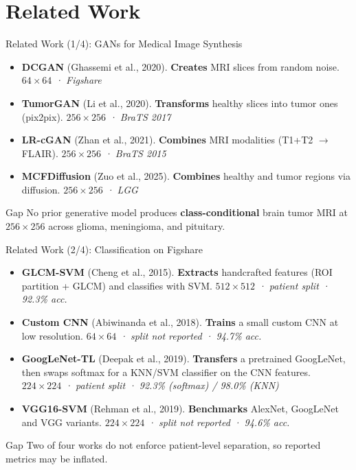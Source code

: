 \documentclass[aspectratio=169]{beamer}
\begin{document}
\section{Related Work}
\begin{frame}{Related Work (1/4): GANs for Medical Image Synthesis}
  \begin{itemize}
    \item \textbf{DCGAN} (Ghassemi et al., 2020). \textbf{Creates} MRI slices from
          random noise. \emph{$64\times64$ · Figshare}
    \item \textbf{TumorGAN} (Li et al., 2020). \textbf{Transforms} healthy slices
          into tumor ones (pix2pix). \emph{$256\times256$ · BraTS 2017}
    \item \textbf{LR-cGAN} (Zhan et al., 2021). \textbf{Combines} MRI
          modalities (T1+T2 $\rightarrow$ FLAIR). \emph{$256\times256$ · BraTS 2015}
    \item \textbf{MCFDiffusion} (Zuo et al., 2025). \textbf{Combines} healthy and
          tumor regions via diffusion. \emph{$256\times256$ · LGG}
  \end{itemize}
  \vspace{0.3em}
  \begin{alertblock}{Gap}
    No prior generative model produces \textbf{class-conditional}
    brain tumor MRI at $256\times256$ across glioma, meningioma, and pituitary.
  \end{alertblock}
\end{frame}

\begin{frame}{Related Work (2/4): Classification on Figshare}
  \begin{itemize}
    \item \textbf{GLCM-SVM} (Cheng et al., 2015). \textbf{Extracts} handcrafted
          features (ROI partition + GLCM) and classifies with SVM.
          \emph{$512\times512$ · patient split · 92.3\% acc.}
    \item \textbf{Custom CNN} (Abiwinanda et al., 2018). \textbf{Trains} a small
          custom CNN at low resolution.
          \emph{$64\times64$ · split not reported · 94.7\% acc.}
    \item \textbf{GoogLeNet-TL} (Deepak et al., 2019). \textbf{Transfers} a
          pretrained GoogLeNet, then swaps softmax for a KNN/SVM classifier on
          the CNN features.
          \emph{$224\times224$ · patient split · 92.3\% (softmax) / 98.0\% (KNN)}
    \item \textbf{VGG16-SVM} (Rehman et al., 2019). \textbf{Benchmarks} AlexNet,
          GoogLeNet and VGG variants.
          \emph{$224\times224$ · split not reported · 94.6\% acc.}
  \end{itemize}
  \vspace{0.3em}
  \begin{alertblock}{Gap}
    Two of four works do not enforce patient-level separation,
    so reported metrics may be inflated.
  \end{alertblock}
\end{frame}
\end{document}
